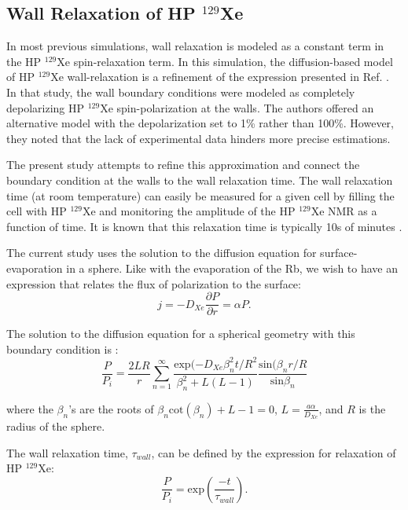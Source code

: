 \subsection{\label{sec:wallrelax} Wall Relaxation of HP $^{129}$Xe}
In most previous simulations, wall relaxation is modeled as a constant term in the HP $^{129}$Xe spin-relaxation term. In this simulation, the diffusion-based model of HP $^{129}$Xe wall-relaxation is a refinement of the expression presented in Ref. \cite{Fink2005}. In that study, the wall boundary conditions were modeled as completely depolarizing HP $^{129}$Xe spin-polarization at the walls. The authors offered an alternative model with the depolarization set to 1\% rather than 100\%. However, they noted that the lack of experimental data hinders more precise estimations.

The present study attempts to refine this approximation and connect the boundary condition at the walls to the wall relaxation time. The wall relaxation time (at room temperature) can easily be measured for a given cell by filling the cell with HP $^{129}$Xe and monitoring the amplitude of the HP $^{129}$Xe NMR as a function of time. It is known that this relaxation time is typically 10s of minutes \cite{Freeman2014}.

The current study uses the solution to the diffusion equation for surface-evaporation in a sphere. Like with the evaporation of the Rb, we wish to have an expression that relates the flux of polarization to the surface:
\begin{equation}
    j=-D_{Xe}\frac{\partial P}{\partial r}=\alpha P.
\end{equation}

The solution to the diffusion equation for a spherical geometry with this boundary condition is \cite{Crank1975}:
\begin{equation}
    \frac{P}{P_i}=\frac{2LR}{r}\sum_{n=1}^{\infty}\frac{\textrm{exp}(-D_{Xe}\beta^2_nt/R^2}{\beta^2_n+L(L-1)}\frac{\textrm{sin}(\beta_n r/R}{\textrm{sin}\beta_n}
    \label{eq:diffsol}
\end{equation}

where the $\beta_n$'s are the roots of $\beta_n\textrm{cot}\left(\beta_n\right)+L-1=0$, $L=\frac{a \alpha}{D_{Xe}}$, and $R$ is the radius of the sphere. 

The wall relaxation time, $\tau_{wall}$, can be defined by the expression for relaxation of HP $^{129}$Xe:
\begin{equation}
    \frac{P}{P_i}=\textrm{exp}\left(\frac{-t}{\tau_{wall}}\right).
    \label{eq:wallrelax}
\end{equation}

